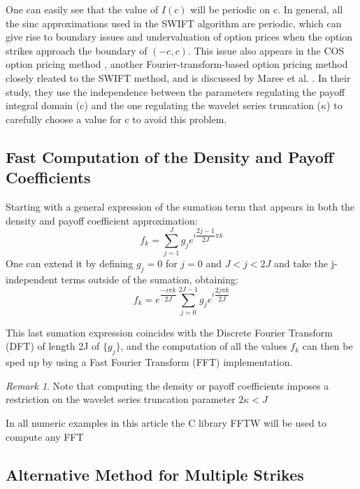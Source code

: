 \documentclass[12,twoside]{mammeTFM}
\theoremstyle{definition}
\theoremstyle{remark}
\newtheorem{remark}[thm]{Remark}
\begin{document}
One can easily see that the value of $I(c)$ will be periodic on c. In general, all the sinc approximations used in the SWIFT algorithm are periodic, which can give rise to boundary issues and undervaluation of option prices when the option strikes approach the boundary of $(-c, c)$. This issue also appears in the COS option pricing method \cite{Fang2008}, another Fourier-transform-based option pricing method closely rleated to the SWIFT method, and is discussed by Maree et al. \cite{mar17}. In their study, they use the independence between the parameters regulating the payoff integral domain (c) and the one regulating the wavelet series truncation ($\kappa$) to carefully choose a value for c to avoid this problem.

\subsection{Fast Computation of the Density and Payoff Coefficients}
Starting with a general expression of the sumation term that appears in both the density and payoff coefficient approximation:
\begin{equation}
f_k = \sum_{j=1}^J g_j e^{i \dfrac{2j - 1}{2J}\pi k}
\end{equation}
One can extend it by defining $g_j = 0$ for $j = 0$ and $J < j < 2J$ and take the j-independent terms outside of the sumation, obtaining:
\begin{equation}
f_k = e^{\dfrac{-i \pi k}{2J}}\sum_{j=0}^{2J - 1} g_j e^{i \dfrac{2j\pi k}{2J}}
\end{equation}

This last sumation expression coincides with the Discrete Fourier Transform (DFT) of length 2J of $\{g_j\}$, and the computation of all the values $f_k$ can then be sped up by using a Fast Fourier Transform (FFT) implementation. 

\begin{remark}
Note that computing the density or payoff coefficients imposes a restriction on the wavelet series truncation parameter $2 \kappa < J$
\end{remark}

In all numeric examples in this article the C library FFTW will be used to compute any FFT \cite{fftw3}

\subsection{Alternative Method for Multiple Strikes}
\end{document}
